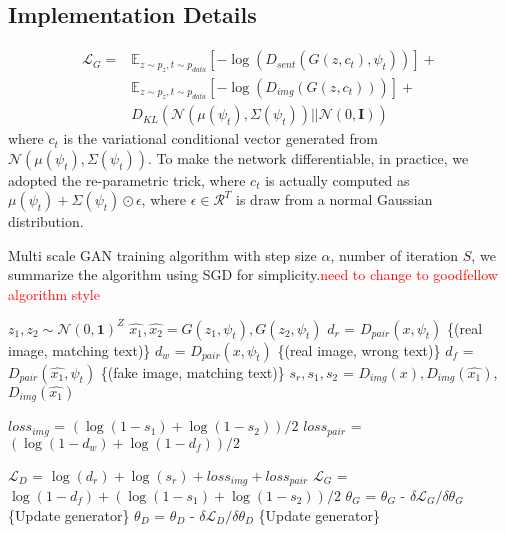 \documentclass[10pt,twocolumn,letterpaper]{article}
\begin{document}
\subsection{Implementation Details}
\begin{equation}
 \label{genloss}
 \begin{split}
 \mathcal{L}_G = & \mathbb{E}_{z\sim p_{z}, t \sim p_{data}}[-\log( D_{sent}( G(z, c_t),  \psi_t) ) ] + \\
				  & \mathbb{E}_{z\sim p_{z}, t \sim p_{data}}[-\log( D_{img}( G(z, c_t) ) ) ] + \\
                  & D_{KL}(\mathcal{N}(\mu(\psi_t), \Sigma(\psi_t) )|| \mathcal{N}(0, \bm{I})) 		   
 \end{split}
 \end{equation}
 where $c_t$ is the variational conditional vector generated from $\mathcal{N}(\mu(\psi_t), \Sigma(\psi_t) )$. To make the network differentiable, in practice, we adopted the re-parametric trick\cite{vae}, where $c_t$ is actually computed as $\mu(\psi_t)+\Sigma(\psi_t)\odot \epsilon$, where $\epsilon\in \mathcal{R}^{T}$ is draw from a normal Gaussian distribution.  
 
 


 \begin{algorithm}
 	\caption{Multi scale GAN training algorithm with step size $\alpha$, number of iteration $S$, we summarize the algorithm using SGD for simplicity.\textcolor{red}{need to change to goodfellow algorithm style}}
 	\label{CHalgorithm}
 	\begin{algorithmic}[1]
 		
 		\State $z_1, z_2 \sim \mathcal{N}(0,\bm{1})^Z$
 		\State $\hat{x_1}, \hat{x_2} = G(z_1, \psi_t),  G(z_2, \psi_{\hat{t}})$ %
 		\State $d_r$ = $D_{pair}(x, \psi_t)$ \{(real image, matching text)\}
 		\State $d_w$ = $D_{pair}(x, \psi_{\hat{t}})$ \{(real image, wrong text)\}
 		\State $d_f$ = $D_{pair}(\hat{x_1}, \psi_t)$ \{(fake image, matching text)\}
 		\State $s_r, s_1, s_2$ = $D_{img}(x), D_{img}(\hat{x_1})$, $D_{img}(\hat{x_1})$ %
 		
 		\State $loss_{img}$ = $ (\log(1-s_1) + \log(1-s_2))/2 $
 		\State $loss_{pair}$ = $ (\log(1-d_w) + \log(1-d_f))/2 $
 		
 		\State $\mathcal{L}_{D}$ = $\log(d_r) + \log(s_r) +loss_{img} + loss_{pair}$
 		\State $\mathcal{L}_{G}$ = $\log(1-d_f) +  ( \log(1-s_1) + \log(1-s_2) )/2 $
 		\State $\theta_G$ = $\theta_G$ - ${\delta \mathcal{L}_G } / {\delta \theta_G}$  \{Update generator\}
 		\State $\theta_D$ = $\theta_D$ - ${\delta \mathcal{L}_D} / {\delta \theta_D}$  \{Update generator\}
 		
 		\EndFor
 		
 	\end{algorithmic}
 \end{algorithm}
 
\end{document}
